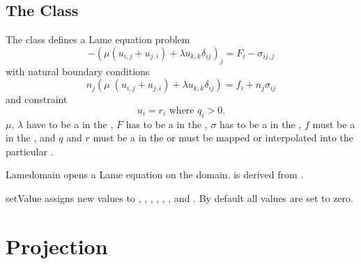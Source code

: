 \subsection{The \Lame Class}
The \Lame class defines a Lame equation problem
\begin{equation}\label{LE.1}
-(\mu (u_{i,j}+u_{j,i})+\lambda u_{k,k}\delta_{ij})_{j} = F_{i}-\sigma_{ij,j}
\end{equation}
with natural boundary conditions
\begin{equation}\label{LE.2}
n_{j}(\mu \; (u_{i,j}+u_{j,i})+\lambda u_{k,k}\delta_{ij}) = f_{i}+n_{j}\sigma_{ij}
\end{equation}
and constraint
\begin{equation}\label{LE.3}
u_{i}=r_{i} \mbox{ where } q_{i}>0 .
\end{equation}
$\mu$, $\lambda$ have to be a \Scalar in the \Function, $F$ has to be a
\Vector in the \Function, $\sigma$ has to be a \Tensor in the \Function,
$f$ must be a \Vector in the \FunctionOnBoundary, and $q$ and $r$ must be a
\Vector in the \SolutionFS or must be mapped or interpolated into the
particular \FunctionSpace.

\begin{classdesc}{Lame}{domain}
opens a Lame equation on the \Domain domain. \Lame is derived from \LinearPDE.
\end{classdesc}
\begin{methoddesc}[Lame]{setValue}{       }
assigns new values to , , , ,
, , and . By default all values are set to zero.
\end{methoddesc}

\section{Projection}
\label{SEC Projection}

